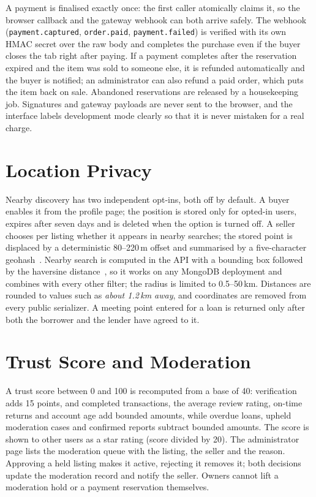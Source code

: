 \documentclass[11pt,letterpaper,oneside]{report}
\newcommand{\code}[1]{\texttt{#1}}
\begin{document}
A payment is finalised exactly once: the first caller atomically claims it, so the browser callback and
the gateway webhook can both arrive safely. The webhook (\code{payment.captured}, \code{order.paid},
\code{payment.failed}) is verified with its own HMAC secret over the raw body and completes the purchase
even if the buyer closes the tab right after paying. If a payment completes after the reservation expired
and the item was sold to someone else, it is refunded automatically and the buyer is notified; an
administrator can also refund a paid order, which puts the item back on sale. Abandoned reservations are
released by a housekeeping job. Signatures and gateway payloads are never sent to the browser, and the
interface labels development mode clearly so that it is never mistaken for a real charge.

\section{Location Privacy}
Nearby discovery has two independent opt-ins, both off by default. A buyer enables it from the profile
page; the position is stored only for opted-in users, expires after seven days and is deleted when the
option is turned off. A seller chooses per listing whether it appears in nearby searches; the stored
point is displaced by a deterministic 80--220\,m offset and summarised by a five-character
geohash~\cite{geohash}. Nearby search is computed in the API with a bounding box followed by the haversine
distance~\cite{sinnott}, so it works on any MongoDB deployment and combines with every other filter; the
radius is limited to 0.5--50\,km. Distances are rounded to values such as \emph{about 1.2\,km away}, and
coordinates are removed from every public serializer. A meeting point entered for a loan is returned only
after both the borrower and the lender have agreed to it.

\section{Trust Score and Moderation}
A trust score between 0 and 100 is recomputed from a base of 40: verification adds 15 points, and
completed transactions, the average review rating, on-time returns and account age add bounded amounts,
while overdue loans, upheld moderation cases and confirmed reports subtract bounded amounts. The score is
shown to other users as a star rating (score divided by 20). The administrator page lists the moderation
queue with the listing, the seller and the reason. Approving a held listing makes it active, rejecting it
removes it; both decisions update the moderation record and notify the seller. Owners cannot lift a
moderation hold or a payment reservation themselves.
\end{document}

